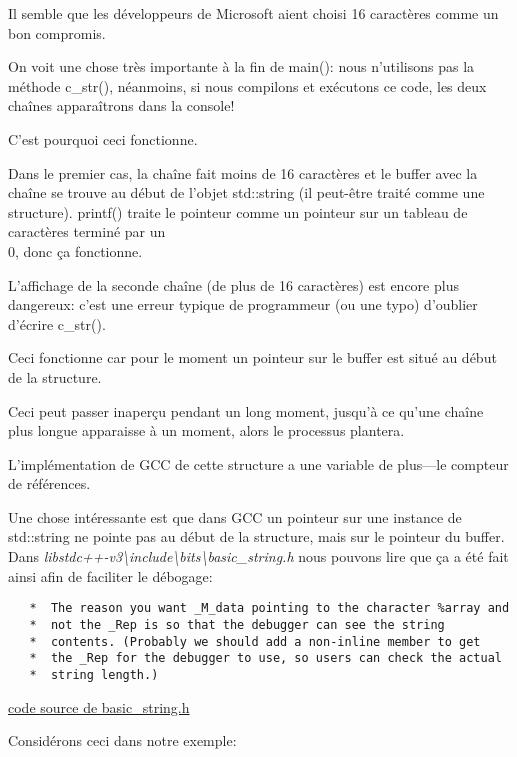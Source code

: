Il semble que les développeurs de Microsoft aient choisi 16 caractères comme un bon
compromis.

On voit une chose très importante à la fin de main(): nous n'utilisons pas la méthode
c\_str(), néanmoins, si nous compilons et exécutons ce code, les deux chaînes apparaîtrons
dans la console!

C'est pourquoi ceci fonctionne.

Dans le premier cas, la chaîne fait moins de 16 caractères et le buffer avec la chaîne
se trouve au début de l'objet std::string (il peut-être traité comme une structure).
printf() traite le pointeur comme un pointeur sur un tableau de caractères terminé
par un \\0, donc ça fonctionne.

L'affichage de la seconde chaîne (de plus de 16 caractères) est encore plus dangereux:
c'est une erreur typique de programmeur (ou une typo) d'oublier d'écrire c\_str().

Ceci fonctionne car pour le moment un pointeur sur le buffer est situé au début de
la structure.

Ceci peut passer inaperçu pendant un long moment, jusqu'à ce qu'une chaîne plus longue
apparaisse à un moment, alors le processus plantera.


L'implémentation de GCC de cette structure a une variable de plus---le compteur de
références.

Une chose intéressante est que dans GCC un pointeur sur une instance de std::string
ne pointe pas au début de la structure, mais sur le pointeur du buffer.
Dans \emph{libstdc++-v3\textbackslash{}include\textbackslash{}bits\textbackslash{}basic\_string.h}
nous pouvons lire que ça a été fait ainsi afin de faciliter le débogage:

\begin{lstlisting}
   *  The reason you want _M_data pointing to the character %array and
   *  not the _Rep is so that the debugger can see the string
   *  contents. (Probably we should add a non-inline member to get
   *  the _Rep for the debugger to use, so users can check the actual
   *  string length.)
\end{lstlisting}

\href{http://go.yurichev.com/17085}{code source de basic\_string.h}

Considérons ceci dans notre exemple:



